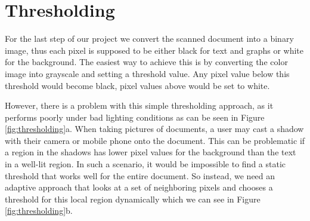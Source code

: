 \documentclass[bibliography=totoc]{scrartcl}
\begin{document}
\section{Thresholding}
For the last step of our project we convert the scanned document into a binary image, thus each pixel is supposed to be either black for text and graphs or white for the background.
The easiest way to achieve this is by converting the color image into grayscale and setting a threshold value.
Any pixel value below this threshold would become black, pixel values above would be set to white.

However, there is a problem with this simple thresholding approach, as it performs poorly under bad lighting conditions as can be seen in Figure \ref{fig:thresholding}a.
When taking pictures of documents, a user may cast a shadow with their camera or mobile phone onto the document.
This can be problematic if a region in the shadows has lower pixel values for the background than the text in a well-lit region.
In such a scenario, it would be impossible to find a static threshold that works well for the entire document.
So instead, we need an adaptive approach that looks at a set of neighboring pixels and chooses a threshold for this local region dynamically which we can see in Figure \ref{fig:thresholding}b. \\
\end{document}

